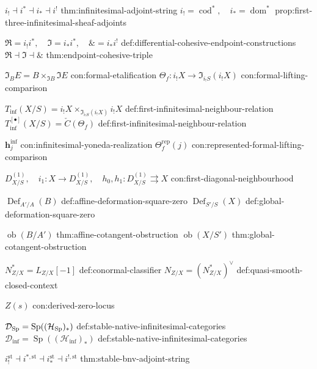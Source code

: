 \begin{longtable}

\NotationPair
{\(i_!\dashv i^*\dashv i_*\dashv i^!\)}
{thm:infinitesimal-adjoint-string}
{\(i_!=\operatorname{cod}^*,\quad i_*=\operatorname{dom}^*\)}
{prop:first-three-infinitesimal-sheaf-adjoints}

\NotationPair
{\(\Re=i_!i^*,\quad \Im=i_*i^*,\quad \&=i_*i^!\)}
{def:differential-cohesive-endpoint-constructions}
{\(\Re\dashv\Im\dashv\&\)}
{thm:endpoint-cohesive-triple}

\NotationPair
{\(\Im_B E=B\times_{\Im B}\Im E\)}
{con:formal-etalification}
{\(\Theta_f:i_!X\to\Im_{i_!S}(i_!X)\)}
{con:formal-lifting-comparison}

\NotationPair
{\(T_{\inf}(X/S)=i_!X\times_{\Im_{i_!S}(i_!X)}i_!X\)}
{def:first-infinitesimal-neighbour-relation}
{\(T_{\inf}^{[\bullet]}(X/S)=\check C(\Theta_f)\)}
{def:first-infinitesimal-neighbour-relation}

\NotationPair
{\(\mathbf h^{\inf}_j\)}
{con:infinitesimal-yoneda-realization}
{\(\Theta_f^{\mathrm{rep}}(j)\)}
{con:represented-formal-lifting-comparison}

\NotationSingle
{\(D^{(1)}_{X/S},\quad i_1:X\to D^{(1)}_{X/S},\quad
  h_0,h_1:D^{(1)}_{X/S}\rightrightarrows X\)}
{con:first-diagonal-neighbourhood}



\NotationPair
{\(\operatorname{Def}_{A'/A}(B)\)}
{def:affine-deformation-square-zero}
{\(\operatorname{Def}_{S'/S}(X)\)}
{def:global-deformation-square-zero}

\NotationPair
{\(\operatorname{ob}(B/A')\)}
{thm:affine-cotangent-obstruction}
{\(\operatorname{ob}(X/S')\)}
{thm:global-cotangent-obstruction}

\NotationPair
{\(N^*_{Z/X}=L_{Z/X}[-1]\)}
{def:conormal-classifier}
{\(N_{Z/X}=(N^*_{Z/X})^\vee\)}
{def:quasi-smooth-closed-context}

\NotationSingle
{\(Z(s)\)}
{con:derived-zero-locus}



\NotationPair
{\(\mathcal D_{\operatorname{Sp}}=\operatorname{Sp}((\mathcal H_{\operatorname{Sp}})_*)\)}
{def:stable-native-infinitesimal-categories}
{\(\mathcal D_{\inf}=\operatorname{Sp}((\mathcal H_{\inf})_*)\)}
{def:stable-native-infinitesimal-categories}

\NotationSingle
{\(i_!^{\mathrm{st}}\dashv i^{*,\mathrm{st}}
  \dashv i_*^{\mathrm{st}}\dashv i^{!,\mathrm{st}}\)}
{thm:stable-bnv-adjoint-string}


\end{longtable}
